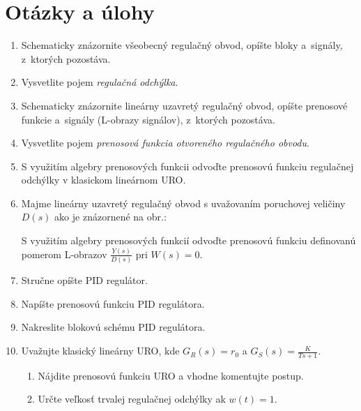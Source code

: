 \documentclass[a4paper, 10pt, ]{article}
\begin{document}
\section{Otázky a úlohy}


\begin{enumerate}[leftmargin=0pt, labelsep=3mm, itemsep=0pt]


    \item Schematicky znázornite všeobecný regulačný obvod, opíšte bloky a~signály, z~ktorých pozostáva.

    \item Vysvetlite pojem \emph{regulačná odchýlka}.

    \item Schematicky znázornite lineárny uzavretý regulačný obvod, opíšte prenosové funkcie a~signály (L-obrazy signálov), z~ktorých pozostáva.

    \item Vysvetlite pojem \emph{prenosová funkcia otvoreného regulačného obvodu}.

    \item S využitím algebry prenosových funkcii odvoďte prenosovú funkciu regulačnej odchýlky v klasickom lineárnom URO.

    \item Majme lineárny uzavretý regulačný obvod s uvažovaním poruchovej veličiny $D(s)$ ako je znázornené na obr.:

    \noindent

    \noindent
    S využitím algebry prenosových funkcií odvoďte prenosovú funkciu definovanú pomerom L-obrazov $\frac{Y(s)}{D(s)}$ pri $W(s) = 0$.





    \item Stručne opíšte PID regulátor.

    \item Napíšte prenosovú funkciu PID regulátora.

    \item Nakreslite blokovú schému PID regulátora.

    \item Uvažujte klasický lineárny URO, kde $\displaystyle G_R(s) = r_0$ a $\displaystyle G_S(s) = \frac{K}{Ts + 1}$.
    \begin{enumerate}
        \item Nájdite prenosovú funkciu URO a vhodne komentujte postup.
        \item Určte veľkosť trvalej regulačnej odchýlky ak $w(t) = 1$.
    \end{enumerate}


\end{enumerate}
\end{document}
